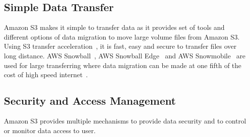 \subsection{Simple Data Transfer} 

Amazon S3 makes it simple to transfer data as it provides set of tools and 
different options of data migration to move large volume files from Amazon S3.
Using S3 transfer acceleration~\cite{hid-sp18-420-amazon-S3-dataTransfer-FAQ}, 
it is fast, easy and secure to transfer files over long distance. AWS 
Snowball~\cite{hid-sp18-420-amazon-snowball}, AWS Snowball 
Edge~\cite{hid-sp18-420-amazon-snowball-edge} and AWS 
Snowmobile~\cite{hid-sp18-420-amazon-snowmobile} are used for large 
transferring where data migration can be made at one fifth of the cost of high 
speed internet~\cite{hid-sp18-420-amazon-S3-cloud-migration}.

\subsection{Security and Access Management} 

Amazon S3 provides multiple mechanisms to provide data security and to control 
or monitor data access to user.


